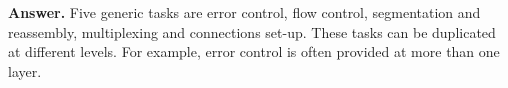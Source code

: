 
\textbf{Answer.} Five generic tasks are error control, flow control,
segmentation and reassembly, multiplexing and connections
set-up. These tasks can be duplicated at different levels. For
example, error control is often provided at more than one layer.
